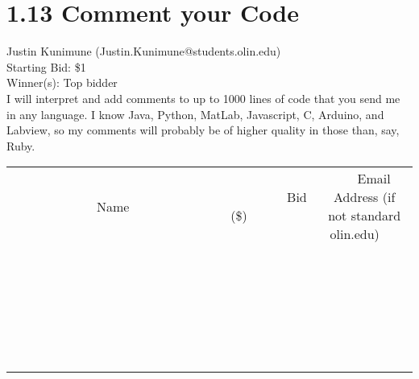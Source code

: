 \documentclass[11pt]{article}
\begin{document}
\section*{1.13 Comment your Code}
Justin Kunimune (Justin.Kunimune@students.olin.edu) \\
Starting Bid: \$1 \\
Winner(s): 
Top bidder \\
I will interpret and add comments to up to 1000 lines of code that you send me in any language. I know Java, Python, MatLab, Javascript, C, Arduino, and Labview, so my comments will probably be of higher quality in those than, say, Ruby. \\[6ex]
\begin{tabular}{c c c}
~~~~~~~~~~~~~Name~~~~~~~~~~~~~ & ~~~~~~~~~Bid (\$)~~~~~~~~~ & ~~~Email Address (if not standard olin.edu)~~~ \\
 & & \\
\hline
 & & \\
\hline
 & & \\
\hline
 & & \\
\hline
 & & \\
\hline
 & & \\
\hline
 & & \\
\hline
 & & \\
\hline
 & & \\
\hline
 & & \\
\hline
 & & \\
\hline
 & & \\
\hline
 & & \\
\hline
 & & \\
\hline
 & & \\
\hline
 & & \\
\hline
 & & \\
\hline
 & & \\
\hline
 & & \\
\hline
 & & \\
\hline
 & & \\
\hline
 & & \\
\hline
 & & \\
\hline
 & & \\
\hline
 & & \\
\hline
 & & \\
\hline
\end{tabular}
\clearpage
\end{document}
